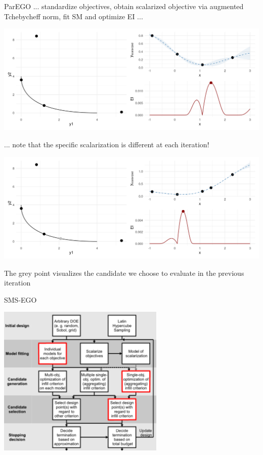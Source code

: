 \documentclass[11pt,compress,t,notes=noshow, xcolor=table]{beamer}
\begin{document}
\begin{vbframe}{ParEGO}
\framebreak
... standardize objectives, obtain scalarized objective via augmented Tchebycheff norm, fit SM and optimize EI ...
\vspace{+0.45cm}
\begin{center}
  \includegraphics[width = \textwidth]{figure_man/multicrit_3.png}
\end{center}

\framebreak
... note that the specific scalarization is different at each iteration!
\begin{center}
  \includegraphics[width = \textwidth]{figure_man/multicrit_4.png}
\end{center}
The grey point visualizes the candidate we choose to evaluate in the previous iteration

\end{vbframe}

\begin{frame}{SMS-EGO}

\centering
\includegraphics[width = 0.6\textwidth]{figure_man/FlowchartMBMO_sms.pdf}

\end{frame}
\end{document}
